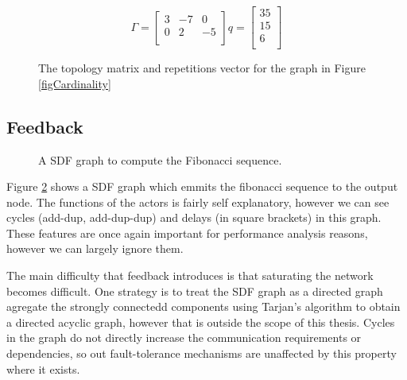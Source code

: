 \begin{figure}
\begin{center}
\[
 \Gamma = \begin{bmatrix}
	3 & -7 & 0 \\
	0 & 2 & -5 \\
     \end{bmatrix}
	q = \begin{bmatrix}
	35 \\
	15 \\
	6 \\
     \end{bmatrix}
\]
\caption{The topology matrix and repetitions vector for the graph in Figure \ref{figCardinality}}
\label{figCardinalityMaths}
\end{center}
\end{figure}

\subsection{Feedback}

\begin{figure}
\begin{center}
	
\caption{A SDF graph to compute the Fibonacci sequence.}
\label{figFibonacci}
\end{center}
\end{figure}

Figure \ref{figFibonacci} shows a SDF graph which emmits the fibonacci sequence to the output node.
The functions of the actors is fairly self explanatory, however we can see cycles (add-dup, add-dup-dup) and delays (in square brackets) in this graph.
These features are once again important for performance analysis reasons, however we can largely ignore them.

The main difficulty that feedback introduces is that saturating the network becomes difficult.
One strategy is to treat the SDF graph as a directed graph agregate the strongly connectedd components using Tarjan's algorithm to obtain a directed acyclic graph, however that is outside the scope of this thesis.
Cycles in the graph do not directly increase the communication requirements or dependencies, so out fault-tolerance mechanisms are unaffected by this property where it exists.